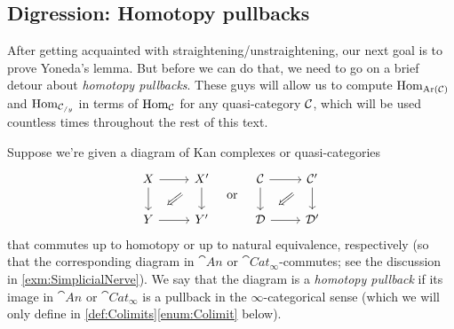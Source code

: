 \subsection{Digression: Homotopy pullbacks}\label{subsec:HomotopyPullbacks}
After getting acquainted with straightening/unstraightening, our next goal is to prove Yoneda's lemma. But before we can do that, we need to go on a brief detour about \emph{homotopy pullbacks}. These guys will allow us to compute $\operatorname{Hom}_{\operatorname{Ar}(\mathcal{C})}$ and $\operatorname{Hom}_{\mathcal{C}_{/y}}$ in terms of $\operatorname{Hom}_{\mathcal{C}}$ for any quasi-category $\mathcal{C}$, which will be used countless times throughout the rest of this text. 
\begin{numpar}\label{def:HomotopyPullback}
	Suppose we're given a diagram of Kan complexes or quasi-categories
	\begin{equation*}
		\begin{tikzcd}
			X\rar\dar & X'\dlar[phantom,"\Longleftarrow"{sloped}]\dar\\
			Y\rar & Y'
		\end{tikzcd}\quad\text{or}\quad
		\begin{tikzcd}
			\Cc\rar\dar & \Cc'\dlar[phantom,"\Longleftarrow"{sloped}]\dar\\
			\Dd\rar & \Dd'
		\end{tikzcd}
	\end{equation*}
	that commutes up to homotopy or up to natural equivalence, respectively (so that the corresponding diagram in $\cat{An}$ or $\cat{Cat}_\infty$-commutes; see the discussion in \cref{exm:SimplicialNerve}). We say that the diagram is a \emph{homotopy pullback} if its image in $\cat{An}$ or $\cat{Cat}_\infty$ is a pullback in the $\infty$-categorical sense (which we will only define in \cref{def:Colimits}\cref{enum:Colimit} below).
	

\end{numpar}
